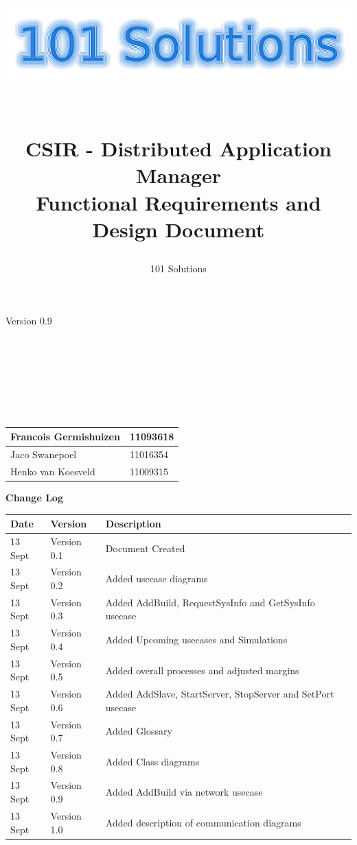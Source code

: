 \documentclass[a4paper,12pt,final]{article}
\title{
\begin{center}
  	\includegraphics[scale=0.3]{101Logo.png} 
  \end{center}
  \textbf{\\}
CSIR - Distributed Application Manager\\
Functional Requirements and Design Document\\
}
\author{101 Solutions}
\begin{document}
\maketitle
\begin{center}
Version 0.9
\end{center}
\textbf{\\}
\textbf{\\}
\textbf{\\}
\textbf{\\}
\textbf{\\}
\textbf{\\}
\begin{center}
\begin{tabular}{|l|l|}
\hline
Francois Germishuizen & 11093618\\
\hline
Jaco Swanepoel & 11016354\\
\hline
Henko van Koesveld & 11009315\\
\hline
\end{tabular}
\end{center}
\thispagestyle{empty}
\newpage
\thispagestyle{empty}
\textbf{\large{Change Log}}
\vspace{6pt}\newline
\begin{tabular}{|l|l|l|}
\hline
Date & Version & Description\\
\hline
13 Sept & Version 0.1 & Document Created\\
\hline
13 Sept & Version 0.2 & Added usecase diagrams\\
\hline
13 Sept & Version 0.3 & Added AddBuild, RequestSysInfo and GetSysInfo usecase\\
\hline
13 Sept & Version 0.4 & Added Upcoming usecases and Simulations\\
\hline
13 Sept & Version 0.5 & Added overall processes and adjusted margins\\
\hline
13 Sept & Version 0.6 & Added AddSlave, StartServer, StopServer and SetPort usecase\\
\hline
13 Sept & Version 0.7 & Added Glossary\\
\hline
13 Sept & Version 0.8 & Added Class diagrams\\
\hline
13 Sept & Version 0.9 & Added AddBuild via network usecase\\
\hline
13 Sept & Version 1.0 & Added description of communication diagrams\\
\hline
\end{tabular}
\newpage
\tableofcontents
\thispagestyle{empty}
\newpage
\end{document}
